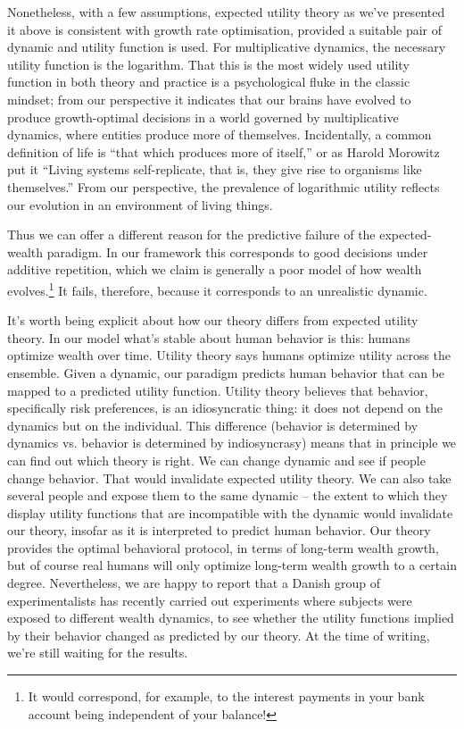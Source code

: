 Nonetheless, with a few assumptions, expected utility theory as we've
presented it above is consistent with growth rate optimisation, provided a suitable pair of dynamic and utility function is used. 
For multiplicative dynamics, the necessary utility function is the logarithm. That this is the most 
widely used utility function in both theory and practice is a psychological fluke in the classic mindset; from our perspective it indicates that 
our brains have evolved to produce growth-optimal decisions in a world governed 
by multiplicative dynamics, \ie where entities produce more of 
themselves. Incidentally, a common definition of life is ``that which produces more of itself,'' or as Harold Morowitz put it \cite[p.~5]{Morowitz1992} ``Living systems self-replicate, that is, they give rise to organisms like themselves.'' From our perspective, the prevalence of logarithmic utility reflects our evolution in an environment of living things.

Thus we can offer a different reason for the predictive failure of the expected-wealth 
paradigm. In our framework this corresponds to good decisions under additive 
repetition, which we claim is generally a poor model of how wealth evolves.\footnote{It 
would correspond, for example, to the interest payments in your bank account being 
independent of your balance!} It fails, therefore, because it corresponds to an unrealistic dynamic. 

It's worth being explicit about how our theory differs from expected utility theory. 
In our model what's stable about human behavior is this: humans optimize wealth over time. Utility theory says humans optimize utility across the ensemble. Given a dynamic, our paradigm predicts human behavior that can be mapped to a predicted utility function. Utility theory believes that behavior, specifically risk preferences, is an idiosyncratic thing: it does not depend on the dynamics but on the individual. This difference (behavior is determined by dynamics vs. behavior is determined by indiosyncrasy) means that in principle we can find out which theory is right. We can change dynamic and see if people change behavior. That would invalidate expected utility theory. We can also take several people and expose them to the same dynamic -- the extent to which they display utility functions that are incompatible with the dynamic would invalidate our theory, insofar as it is interpreted to predict human behavior. Our theory provides the optimal behavioral protocol, in terms of long-term wealth growth, but of course real humans will only optimize long-term wealth growth to a certain degree. Nevertheless, we are happy to report that a Danish group of experimentalists has recently carried out experiments where subjects were exposed to different wealth dynamics, to see whether the utility functions implied by their behavior changed as predicted by our theory. At the time of writing, we're still waiting for the results.

